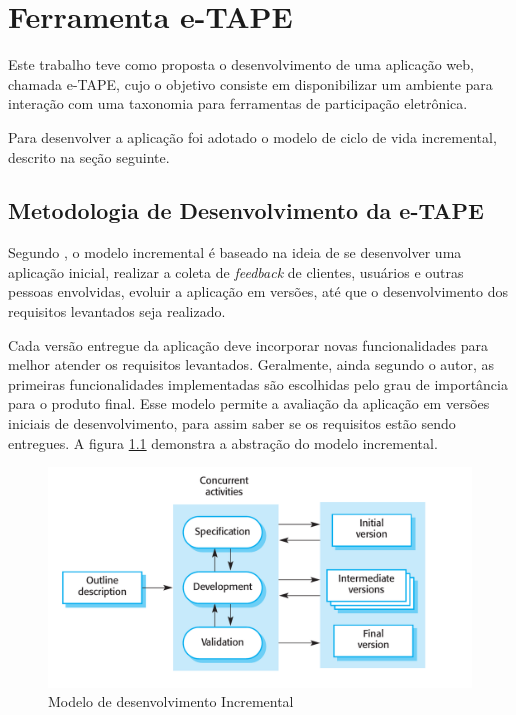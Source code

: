 \chapter[Ferramenta]{Ferramenta e-TAPE}
\label{cap:cap3}
Este trabalho teve como proposta o desenvolvimento de uma aplicação web, chamada e-TAPE, cujo o objetivo consiste em
disponibilizar um ambiente para interação com uma taxonomia para ferramentas de participação eletrônica.

\par
Para desenvolver a aplicação foi adotado o modelo de ciclo de vida incremental, descrito na seção seguinte.

\section {Metodologia de Desenvolvimento da e-TAPE}
\label{sec:Metodologia de Desenvolvimento da e-TAPE}
\par
Segundo , o modelo incremental é baseado na ideia de se desenvolver uma aplicação inicial,
realizar a coleta de \textit{feedback} de clientes, usuários e outras pessoas envolvidas, evoluir a aplicação em versões, até que o desenvolvimento dos requisitos levantados seja realizado.

\par
Cada versão entregue da aplicação deve incorporar novas funcionalidades para melhor atender os requisitos levantados. Geralmente, ainda segundo o autor, as primeiras funcionalidades
implementadas são escolhidas pelo grau de importância para o produto final. Esse modelo permite a avaliação da aplicação em versões iniciais de desenvolvimento, para assim saber 
se os requisitos estão sendo entregues. A figura \ref{fig:modelo-incremental} demonstra a abstração do modelo incremental.


\begin{figure}[!ht]
    \centering
    \includegraphics[scale=0.20]{./figuras/modelo_incremental.png}
    \caption{Modelo de desenvolvimento Incremental }
    \label{fig:modelo-incremental}
\end{figure}

